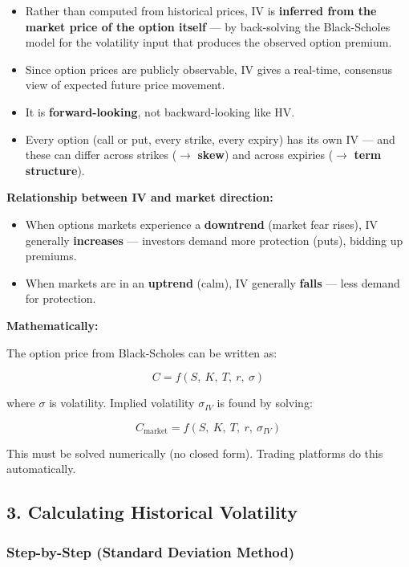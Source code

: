 \documentclass[12pt,openany]{book}
\begin{document}
\begin{itemize}[leftmargin=*]
    \item Rather than computed from historical prices, IV is \textbf{inferred from the market price of the option itself} — by back-solving the Black-Scholes model for the volatility input that produces the observed option premium.
    \item Since option prices are publicly observable, IV gives a real-time, consensus view of expected future price movement.
    \item It is \textbf{forward-looking}, not backward-looking like HV.
    \item Every option (call or put, every strike, every expiry) has its own IV — and these can differ across strikes (\(\rightarrow\) \textbf{skew}) and across expiries (\(\rightarrow\) \textbf{term structure}).
\end{itemize}

\textbf{Relationship between IV and market direction:}
\begin{itemize}[leftmargin=*]
    \item When options markets experience a \textbf{downtrend} (market fear rises), IV generally \textbf{increases} — investors demand more protection (puts), bidding up premiums.
    \item When markets are in an \textbf{uptrend} (calm), IV generally \textbf{falls} — less demand for protection.
\end{itemize}

\textbf{Mathematically:}

The option price from Black-Scholes can be written as:

\[
C = f(S,\ K,\ T,\ r,\ \sigma)
\]

where \(\sigma\) is volatility. Implied volatility \(\sigma_{IV}\) is found by solving:

\[
C_{\text{market}} = f(S,\ K,\ T,\ r,\ \sigma_{IV})
\]

This must be solved numerically (no closed form). Trading platforms do this automatically.

\subsection{3. Calculating Historical Volatility}

\subsubsection{Step-by-Step (Standard Deviation Method)}
\end{document}
